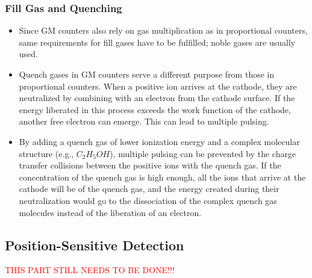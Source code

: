 \subsubsection{Fill Gas and Quenching}
\begin{itemize}
    \item Since GM counters also rely on gas multiplication as in proportional counters, same requirements for fill gases have to be fulfilled; noble gases are usually used. 
    \item Quench gases in GM counters serve a different purpose from those in proportional counters. When a positive ion arrives at the cathode, they are neutralized by combining with an electron from the cathode surface. If the energy liberated in this process exceeds the work function of the cathode, another free electron can emerge. This can lead to multiple pulsing. 
    \item By adding a quench gas of lower ionization energy and a complex molecular structure (e.g., $C_2H_5OH$), multiple pulsing can be prevented by the charge transfer collisions between the positive ions with the quench gas. If the concentration of the quench gas is high enough, all the ions that arrive at the cathode will be of the quench gas, and the energy created during their neutralization would go to the dissociation of the complex quench gas molecules instead of the liberation of an electron.  
\end{itemize}

\subsection{Position-Sensitive Detection}
\textcolor{red}{THIS PART STILL NEEDS TO BE DONE!!!}
